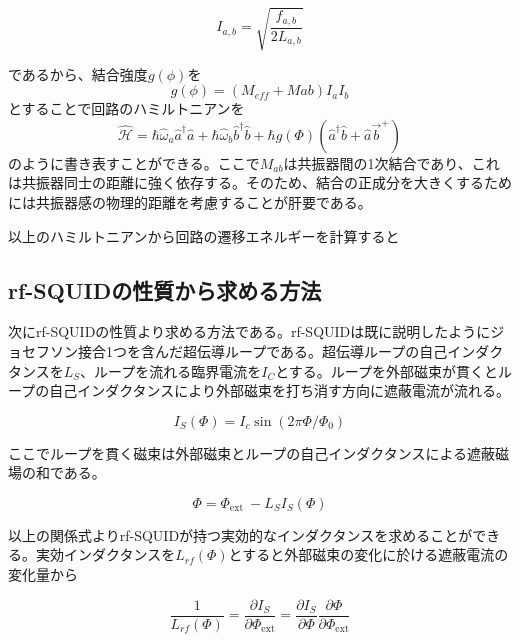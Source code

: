 \begin{equation}
    I_{a,b} = \sqrt{\frac{f_{a,b}}{2 L_{a,b}}}
\end{equation}

であるから、結合強度$g(\phi)$を
\begin{equation}
    g(\phi) = (M_{eff}+M{ab})I_a I_b
\end{equation}
とすることで回路のハミルトニアンを
\begin{equation}
    \hat{\mathcal{H}} = \hbar \hat{\omega}_{a} \hat{a}^{\dagger} \hat{a}+\hbar \hat{\omega}_{b} \hat{b}^{\dagger} \hat{b}+\hbar g(\Phi)\left(\hat{a}^{\dagger}\hat{b}+\hat{a} \vec{b}^{+}\right)
\end{equation}
のように書き表すことができる。ここで$M_{ab}$は共振器間の1次結合であり、これは共振器同士の距離に強く依存する。そのため、結合の正成分を大きくするためには共振器感の物理的距離を考慮することが肝要である。

以上のハミルトニアンから回路の遷移エネルギーを計算すると


\subsection{rf-SQUIDの性質から求める方法}
次にrf-SQUIDの性質より求める方法である。rf-SQUIDは既に説明したようにジョセフソン接合1つを含んだ超伝導ループである。超伝導ループの自己インダクタンスを$L_S$、ループを流れる臨界電流を$I_C$とする。ループを外部磁束が貫くとループの自己インダクタンスにより外部磁束を打ち消す方向に遮蔽電流が流れる。

\begin{equation}
    I_{S}(\Phi)=I_{c} \sin \left(2 \pi \Phi / \Phi_{0}\right)
\end{equation}

ここでループを貫く磁束は外部磁束とループの自己インダクタンスによる遮蔽磁場の和である。

\begin{equation}
    \Phi=\Phi_{\text {ext }}-L_{S} I_{S}(\Phi)
\end{equation}

以上の関係式よりrf-SQUIDが持つ実効的なインダクタンスを求めることができる。実効インダクタンスを$L_{rf}(\Phi)$とすると外部磁束の変化に於ける遮蔽電流の変化量から

\begin{equation}
    \frac{1}{L_{rf}(\Phi)}=\frac{\partial I_{S}}{\partial \Phi_{\mathrm{ext}}}=\frac{\partial I_{S}}{\partial \Phi} \frac{\partial \Phi}{\partial \Phi_{\mathrm{ext}}}
\end{equation}

